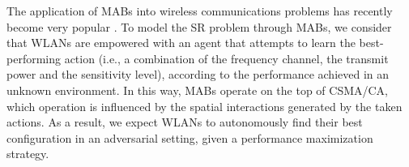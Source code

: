 \documentclass[preprint,12pt]{elsarticle}
\begin{document}
The application of MABs into wireless communications problems has recently become very popular \cite{chen2010distributed, maghsudi2015channel, maghsudi2015joint}. To model the SR problem through MABs, we consider that WLANs are empowered with an agent that attempts to learn the best-performing action (i.e., a combination of the frequency channel, the transmit power and the sensitivity level), according to the performance achieved in an unknown environment. In this way, MABs operate on the top of CSMA/CA, which operation is influenced by the spatial interactions generated by the taken actions. As a result, we expect WLANs to autonomously find their best configuration in an adversarial setting, given a performance maximization strategy. %

\end{document}
